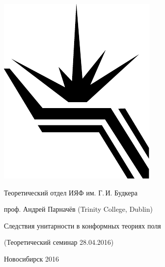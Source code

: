 \documentclass[12pt,pagesize,paper=landscape,paper=192mm:108mm]{scrbook}
\begin{document}
\begin{titlepage}
  \vspace*{-0.5em}
  \begin{center}    
    \hspace*{3em}
    \begin{minipage}[t]{3em}
      \includegraphics[width=\textwidth]{../BINP-logo}
    \end{minipage}\hfill
    Теоретический отдел ИЯФ им. Г.\,И. Будкера\hfill
    \hspace*{7em}
    \bigskip

    \large
    проф. Андрей Парначёв  (Trinity College, Dublin)
    \bigskip
    \bigskip

    \LARGE
    Следствия унитарности в конформных теориях поля
    
    \bigskip

    \normalsize
    (Теоретический семинар 28.04.2016)
    \vfill

    \normalsize

    \normalsize \ccbysa\hspace{0.5em}  Новосибирск 2016
  \end{center}
\end{titlepage}
\end{document}
